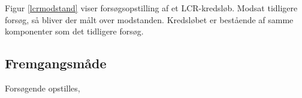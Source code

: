 Figur \ref{lcrmodstand} viser forsøgsopstilling af et LCR-kredsløb. Modsat tidligere forsøg, så bliver der målt over modstanden. Kredsløbet er bestående af samme komponenter som det tidligere forsøg.

\subsection{Fremgangsmåde}

Forsøgende opstilles, 


\newpage